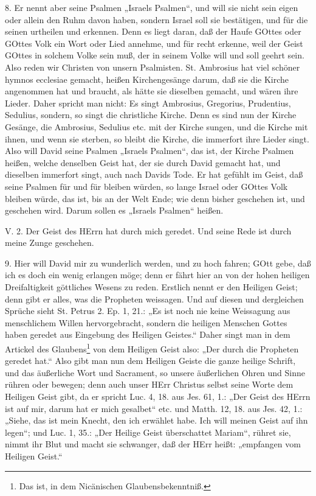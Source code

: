 8. Er nennt aber seine Psalmen „Israels Psalmen“, und will sie nicht sein eigen oder allein den Ruhm davon haben, sondern Israel soll sie bestätigen, und für die seinen urtheilen und erkennen. Denn es liegt daran, daß der Haufe GOttes oder GOttes Volk ein Wort oder Lied annehme, und für recht erkenne, weil der Geist GOttes in solchem Volke sein muß, der in seinem Volke will und soll geehrt sein. Also reden wir Christen von unsern Psalmisten. St. Ambrosius hat viel schöner hymnos ecclesiae gemacht, heißen Kirchengesänge darum, daß sie die Kirche angenommen hat und braucht, als hätte sie dieselben gemacht, und wären ihre Lieder. Daher spricht man nicht: Es singt Ambrosius, Gregorius, Prudentius, Sedulius, sondern, so singt die christliche Kirche. Denn es sind nun der Kirche Gesänge, die Ambrosius, Sedulius etc. mit der Kirche sungen, und die Kirche mit ihnen, und wenn sie sterben, so bleibt die Kirche, die immerfort ihre Lieder singt. Also will David seine Psalmen „Israels Psalmen“, das ist, der Kirche Psalmen heißen, welche denselben Geist hat, der sie durch David gemacht hat, und dieselben immerfort singt, auch nach Davids Tode. Er hat gefühlt im Geist, daß seine Psalmen für und für bleiben würden, so lange Israel oder GOttes Volk bleiben würde, das ist, bis an der Welt Ende; wie denn bisher geschehen ist, und geschehen wird. Darum sollen es „Israels Psalmen“ heißen.

\begin{schriftzitat}
V. 2. Der Geist des HErrn hat durch mich geredet. Und seine Rede ist durch meine Zunge geschehen.
\end{schriftzitat}

9. Hier will David mir zu wunderlich werden, und zu hoch fahren; GOtt gebe, daß ich es doch ein wenig erlangen möge; denn er fährt hier an von der hohen heiligen Dreifaltigkeit göttliches Wesens zu reden. Erstlich nennt er den Heiligen Geist; denn gibt er alles, was die Propheten weissagen. Und auf diesen und dergleichen Sprüche sieht St. Petrus 2. Ep. 1, 21.: „Es ist noch nie keine Weissagung aus menschlichem Willen hervorgebracht, sondern die heiligen
Menschen Gottes haben geredet aus Eingebung des Heiligen Geistes.“ Daher singt man in dem Artickel des Glaubens\footnote{Das ist, in dem Nicänischen Glaubensbekenntniß.} von dem Heiligen Geist also: „Der durch die Propheten geredet hat.“ Also gibt man nun dem Heiligen Geiste die ganze heilige Schrift, und das äußerliche Wort und Sacrament, so unsere äußerlichen Ohren und Sinne rühren oder bewegen; denn auch unser HErr Christus selbst seine Worte dem Heiligen Geist gibt, da er spricht Luc. 4, 18. aus Jes. 61, 1.: „Der Geist des HErrn ist auf mir, darum hat er mich gesalbet“ etc. und Matth. 12, 18. aus Jes. 42, 1.: „Siehe, das ist mein Knecht, den ich erwählet habe. Ich will meinen Geist auf ihn legen“; und Luc. 1, 35.: „Der Heilige Geist überschattet Mariam“, rühret sie, nimmt ihr Blut und macht sie schwanger, daß der HErr heißt: „empfangen vom Heiligen Geist.“

